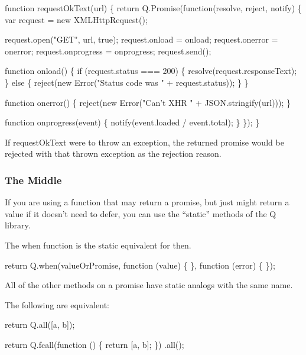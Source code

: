 \begin{DoxyCode}
function requestOkText(url) \{
    return Q.Promise(function(resolve, reject, notify) \{
        var request = new XMLHttpRequest();

        request.open("GET", url, true);
        request.onload = onload;
        request.onerror = onerror;
        request.onprogress = onprogress;
        request.send();

        function onload() \{
            if (request.status === 200) \{
                resolve(request.responseText);
            \} else \{
                reject(new Error("Status code was " + request.status));
            \}
        \}

        function onerror() \{
            reject(new Error("Can't XHR " + JSON.stringify(url)));
        \}

        function onprogress(event) \{
            notify(event.loaded / event.total);
        \}
    \});
\}
\end{DoxyCode}


If {\ttfamily request\+Ok\+Text} were to throw an exception, the returned promise would be rejected with that thrown exception as the rejection reason.

\subsubsection*{The Middle}

If you are using a function that may return a promise, but just might return a value if it doesn’t need to defer, you can use the “static” methods of the Q library.

The {\ttfamily when} function is the static equivalent for {\ttfamily then}.


\begin{DoxyCode}
return Q.when(valueOrPromise, function (value) \{
\}, function (error) \{
\});
\end{DoxyCode}


All of the other methods on a promise have static analogs with the same name.

The following are equivalent\+:


\begin{DoxyCode}
return Q.all([a, b]);
\end{DoxyCode}



\begin{DoxyCode}
return Q.fcall(function () \{
    return [a, b];
\})
.all();
\end{DoxyCode}



